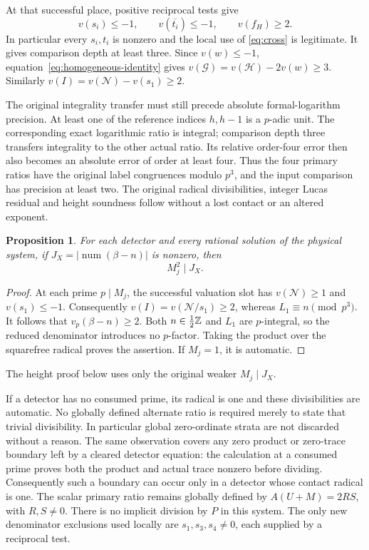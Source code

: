 \documentclass[11pt,a4paper]{article}
\newtheorem{proposition}{Proposition}
\begin{document}
At that successful place, positive reciprocal tests give
\[
 v(s_i)\le-1,\qquad v(\overline{t_i})\le-1,
 \qquad v(f_H)\ge2.
\]
In particular every $s_i,t_i$ is nonzero and the local use of
\eqref{eq:cross} is legitimate. It gives comparison depth at least
three. Since $v(w)\le-1$, equation~\eqref{eq:homogeneous-identity}
gives $v(\mathcal G)=v(\mathcal H)-2v(w)\ge3$.
Similarly $v(I)=v(\mathcal N)-v(s_1)\ge2$.

The original integrality transfer must still precede absolute
formal-logarithm precision. At least one of the reference indices
$h,h-1$ is a $p$-adic unit. The corresponding exact logarithmic
ratio is integral; comparison depth three transfers integrality to
the other actual ratio. Its relative order-four error then also
becomes an absolute error of order at least four. Thus the four
primary ratios have the original label congruences modulo $p^3$,
and the input comparison has precision at least two. The original radical
divisibilities, integer Lucas residual and height soundness follow
without a lost contact or an altered exponent.

\begin{proposition}\label{prop:input-depth-two}
For each detector and every rational solution of the physical system,
if $J_X=|\operatorname{num}(\beta-n)|$ is nonzero, then
\[
                              M_j^2\mid J_X.
\]
\end{proposition}
\begin{proof}
At each prime $p\mid M_j$, the successful valuation slot has
$v(\mathcal N)\ge1$ and $v(s_1)\le-1$. Consequently
$v(I)=v(\mathcal N/s_1)\ge2$, whereas $L_1\equiv n\pmod{p^3}$.
It follows that $v_p(\beta-n)\ge2$. Both $n\in\tfrac12\mathbb Z$ and
$L_1$ are $p$-integral, so the reduced denominator introduces no
$p$-factor. Taking the product over the squarefree radical proves
the assertion. If $M_j=1$, it is automatic.
\end{proof}
The height proof below uses only the original weaker $M_j\mid J_X$.

If a detector has no consumed prime, its radical is one and these
divisibilities are automatic. No globally defined alternate ratio
is required merely to state that trivial divisibility. In particular
global zero-ordinate strata are not discarded without a reason.
The same observation covers any zero product or zero-trace boundary
left by a cleared detector equation: the calculation at a consumed
prime proves both the product and actual trace nonzero before dividing.
Consequently such a boundary can occur only in a detector whose
contact radical is one.
The scalar primary ratio remains globally defined by
$A(U+M)=2RS$, with $R,S\ne0$. There is no implicit division by
$P$ in this system. The only new denominator exclusions used locally
are $s_1,s_3,s_4\ne0$, each supplied by a reciprocal test.
\end{document}
